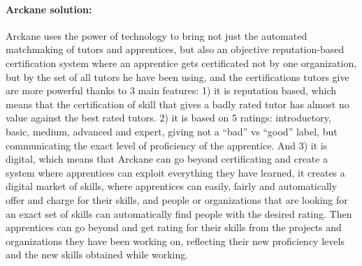 \paragraph{Arckane solution:} Arckane uses the power of technology to bring not just the automated matchmaking of tutors and apprentices, but also an objective reputation-based certification system where an apprentice gets certificated not by one organization, but by the set of all tutors he have been using, and the certifications tutors give are more powerful thanks to 3 main features: 1) it is reputation based, which means that the certification of skill that gives a badly rated tutor has almost no value against the best rated tutors. 2) it is based on 5 ratings: introductory, basic, medium, advanced and expert, giving not a “bad” vs “good” label, but communicating the exact level of proficiency of the apprentice. And 3) it is digital, which means that Arckane can go beyond certificating and create a system where apprentices can exploit everything they have learned, it creates a digital market of skills, where apprentices can easily, fairly and automatically offer and charge for their skills, and people or organizations that are looking for an exact set of skills can automatically find people with the desired rating. Then apprentices can go beyond and get rating for their skills from the projects and organizations they have been working on, reflecting their new proficiency levels and the new skills obtained while working.

